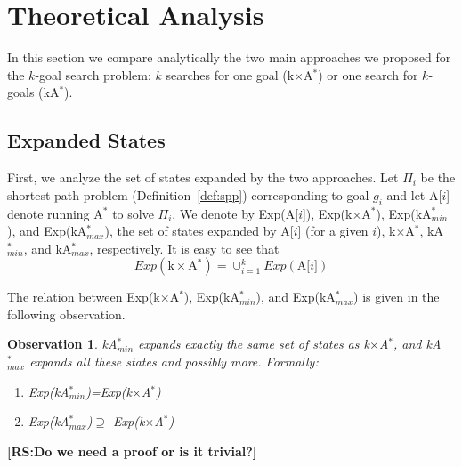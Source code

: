 \documentclass{aicom2e}
\newtheorem{observation}{Observation}
\newcommand{\kgs}{$k$-goal search}
\newcommand{\astar}{A$^*$}
\newcommand{\kastar}{kA$^*$}
\newcommand{\kastarmin}{kA$^*_{min}$}
\newcommand{\kastarmax}{kA$^*_{max}$}
\newcommand{\kxastar}{k$\times$A$^*$}
\newcommand{\astari}[1]{A[$#1$]}
\newcommand{\roni}[1]{\textbf{[RS:#1]}}
\begin{document}
	



\section{Theoretical Analysis}
In this section we compare analytically the two main approaches we proposed for the \kgs{} problem: $k$ searches for one goal (\kxastar{}) or one search for $k$-goals (\kastar{}). 
\subsection{Expanded States}
First, we analyze the set of states expanded by the two approaches. Let $\Pi_i$ be the shortest path problem (Definition~\ref{def:spp}) corresponding to goal $g_i$ and let \astari{i} denote running \astar{} to solve $\Pi_i$. 
We denote by Exp(\astari{i}), Exp(\kxastar{}), Exp(\kastarmin), and Exp(\kastarmax), 
the set of states expanded by \astari{i} (for a given $i$), \kxastar{}, \kastarmin, and \kastarmax{}, respectively. It is easy to see that
\[ Exp(\text{\kxastar{}})=\cup_{i=1}^k Exp(\text{\astari{i}}) \]
 
The relation between Exp(\kxastar{}), Exp(\kastarmin), and Exp(\kastarmax) is given in the following observation.
\begin{observation}
	\kastarmin{} expands exactly the same set of states as \kxastar{}, 
	and \kastarmax{} expands all these states and possibly more. Formally:
	\begin{enumerate}
		\item Exp(\kastarmin{})=Exp(\kxastar{})
		\item Exp(\kastarmax{})$\supseteq$ Exp(\kxastar{})
	\end{enumerate}
\label{obs:expandedStates}
\end{observation}
\roni{Do we need a proof or is it trivial?}
\end{document}
